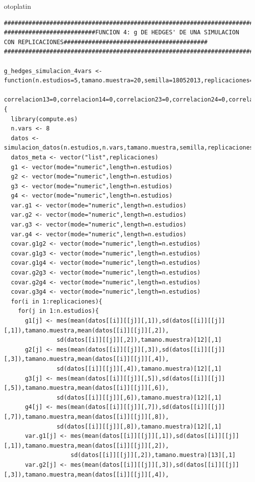 otoplatin\documentclass[a4paper,openright,12pt]{report}
\begin{document}
{\begin{verbatim}
##############################################################################################################################
##########################FUNCION 4: g DE HEDGES' DE UNA SIMULACION CON REPLICACIONES#########################################
##############################################################################################################################

g_hedges_simulacion_4vars <- function(n.estudios=5,tamano.muestra=20,semilla=18052013,replicaciones=5,correlacion12=0,
                                      correlacion13=0,correlacion14=0,correlacion23=0,correlacion24=0,correlacion34=0){
  library(compute.es)
  n.vars <- 8
  datos <- simulacion_datos(n.estudios,n.vars,tamano.muestra,semilla,replicaciones)
  datos_meta <- vector("list",replicaciones)
  g1 <- vector(mode="numeric",length=n.estudios)
  g2 <- vector(mode="numeric",length=n.estudios)
  g3 <- vector(mode="numeric",length=n.estudios)
  g4 <- vector(mode="numeric",length=n.estudios)
  var.g1 <- vector(mode="numeric",length=n.estudios)
  var.g2 <- vector(mode="numeric",length=n.estudios)
  var.g3 <- vector(mode="numeric",length=n.estudios)
  var.g4 <- vector(mode="numeric",length=n.estudios)
  covar.g1g2 <- vector(mode="numeric",length=n.estudios) 
  covar.g1g3 <- vector(mode="numeric",length=n.estudios)
  covar.g1g4 <- vector(mode="numeric",length=n.estudios) 
  covar.g2g3 <- vector(mode="numeric",length=n.estudios)
  covar.g2g4 <- vector(mode="numeric",length=n.estudios) 
  covar.g3g4 <- vector(mode="numeric",length=n.estudios) 
  for(i in 1:replicaciones){
    for(j in 1:n.estudios){
      g1[j] <- mes(mean(datos[[i]][[j]][,1]),sd(datos[[i]][[j]][,1]),tamano.muestra,mean(datos[[i]][[j]][,2]),
               sd(datos[[i]][[j]][,2]),tamano.muestra)[12][,1]
      g2[j] <- mes(mean(datos[[i]][[j]][,3]),sd(datos[[i]][[j]][,3]),tamano.muestra,mean(datos[[i]][[j]][,4]),
               sd(datos[[i]][[j]][,4]),tamano.muestra)[12][,1]
      g3[j] <- mes(mean(datos[[i]][[j]][,5]),sd(datos[[i]][[j]][,5]),tamano.muestra,mean(datos[[i]][[j]][,6]),
               sd(datos[[i]][[j]][,6]),tamano.muestra)[12][,1]
      g4[j] <- mes(mean(datos[[i]][[j]][,7]),sd(datos[[i]][[j]][,7]),tamano.muestra,mean(datos[[i]][[j]][,8]),
               sd(datos[[i]][[j]][,8]),tamano.muestra)[12][,1]
      var.g1[j] <- mes(mean(datos[[i]][[j]][,1]),sd(datos[[i]][[j]][,1]),tamano.muestra,mean(datos[[i]][[j]][,2]),
                   sd(datos[[i]][[j]][,2]),tamano.muestra)[13][,1]
      var.g2[j] <- mes(mean(datos[[i]][[j]][,3]),sd(datos[[i]][[j]][,3]),tamano.muestra,mean(datos[[i]][[j]][,4]),

\end{verbatim}}
\end{document}
